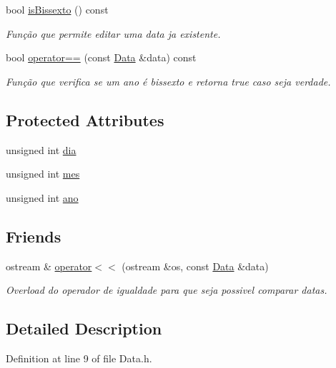 \begin{DoxyCompactItemize}
bool \hyperlink{class_data_a5b6b3123dc96de5969fc435f26322bc2}{is\+Bissexto} () const 
\begin{DoxyCompactList}\small\item\em Função que permite editar uma data ja existente. \end{DoxyCompactList}\item 
bool \hyperlink{class_data_a682016837c60b8e801d4bcee3e694039}{operator==} (const \hyperlink{class_data}{Data} \&data) const 
\begin{DoxyCompactList}\small\item\em Função que verifica se um ano é bissexto e retorna true caso seja verdade. \end{DoxyCompactList}\end{DoxyCompactItemize}
\subsection*{Protected Attributes}
\begin{DoxyCompactItemize}
\item 
unsigned int \hyperlink{class_data_a71a904380d17858da0b902e9a2563546}{dia}
\item 
unsigned int \hyperlink{class_data_a586deb479ec2031a0d3ceec8280f7706}{mes}
\item 
unsigned int \hyperlink{class_data_a1811fab972bdf6ed644c4eb7412bd043}{ano}
\end{DoxyCompactItemize}
\subsection*{Friends}
\begin{DoxyCompactItemize}
\item 
ostream \& \hyperlink{class_data_acab3a0f9e78c85c62b0ea9348aa877d8}{operator$<$$<$} (ostream \&os, const \hyperlink{class_data}{Data} \&data)
\begin{DoxyCompactList}\small\item\em Overload do operador de igualdade para que seja possivel comparar datas. \end{DoxyCompactList}\end{DoxyCompactItemize}


\subsection{Detailed Description}


Definition at line 9 of file Data.\+h.



